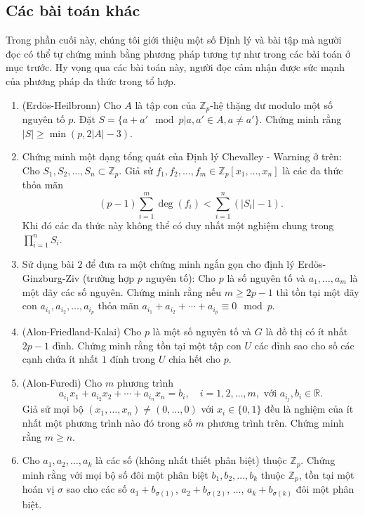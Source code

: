 \subsection{Các bài toán khác}
Trong phần cuối này, chúng tôi giới thiệu một số Định lý và bài tập mà người đọc có thể tự chứng minh bằng phương pháp tương tự như trong các bài toán ở mục trước. Hy vọng qua các bài toán này, người đọc cảm nhận được sức mạnh của phương pháp đa thức trong tổ hợp.
	\begin{enumerate}[1.]
	\item (Erd\"os-Heilbronn) Cho $A$ là tập con của $\mathbb{Z}_p$-hệ thặng dư modulo một số nguyên tố $p$. Đặt $S=\{a+a' \mod p|a,a'\in A, a\ne a'\}$. Chứng minh rằng $|S|\ge \min (p, 2|A|-3)$.
	\item Chứng minh một dạng tổng quát của Định lý Chevalley - Warning ở trên: Cho $S_1, S_2, \dots, S_n \subset \mathbb{Z}_p$. Giả sử $f_1, f_2, \dots, f_m\in \mathbb{Z}_p [x_1, \dots, x_n]$ là các đa thức thỏa mãn 
	$$\displaystyle (p-1) \sum \limits_{i=1}^m \deg (f_i) <\sum \limits_{i=1}^n \left( |S_i| - 1 \right).$$
	 Khi đó các đa thức này không thể có duy nhất một nghiệm chung trong $\displaystyle \prod \limits_{i=1}^n S_i$. 
	\item Sử dụng bài $2$ để đưa ra một chứng minh ngắn gọn cho định lý Erd\"os-Ginzburg-Ziv (trường hợp $p$ nguyên tố): Cho $p$ là số nguyên tố và $a_1, \dots, a_m$ là một dãy các số nguyên. Chứng minh rằng nếu $m \geq 2p-1$ thì tồn tại một dãy con $a_{i_1}, a_{i_2},\dots, a_{i_p}$ thỏa  mãn $a_{i_1}+a_{i_2}+\cdots + a_{i_p} \equiv 0 \mod p$.
	\item (Alon-Friedland-Kalai) Cho $p$ là một số nguyên tố và $G$ là đồ thị có ít nhất $2p-1$ đỉnh. Chứng minh rằng tồn tại một tập con $U$ các đỉnh sao cho số các cạnh chứa ít nhất $1$ đỉnh trong $U$ chia hết cho $p$.
	\item (Alon-Furedi) Cho $m$ phương trình 
		\[a_{i_1}x_1 + a_{i_2}x_2 + \cdots+ a_{i_n}x_n =b_i,\quad i=1,2,\dots,m, \text{ với } a_{i_j},b_i \in \mathbb{R}.\]
	Giả sử mọi bộ $(x_1,\dots,x_n)\ne (0,\dots,0)$ với $x_i \in \{0,1\}$ đều là nghiệm của ít nhất một phương trình nào đó trong số $m$ phương trình trên. Chứng minh rằng $m\geq n$.
	\item Cho $a_1, a_2, \dots, a_k$ là các số (không nhất thiết phân biệt) thuộc $\mathbb{Z}_p$. Chứng minh rằng với mọi bộ số đôi một phân biệt $b_1, b_2, \dots, b_k$ thuộc $\mathbb{Z}_p$, tồn tại một hoán vị $\sigma$ sao cho các số $a_1 + b_{\sigma (1)}$, $a_2+b_{\sigma (2)}$, $\dots$, $a_k + b_{\sigma (k)}$ đôi một phân biệt.
	\end{enumerate}
